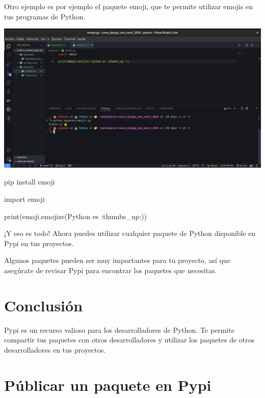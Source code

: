 \documentclass[
  a4paper,
  DIV=11,
  numbers=noendperiod,
  onepage,
  openany]{scrreprt}
\newenvironment{Shaded}{\begin{snugshade}}{\end{snugshade}}
\newcommand{\BuiltInTok}[1]{\textcolor[rgb]{0.00,0.23,0.31}{#1}}
\newcommand{\ExtensionTok}[1]{\textcolor[rgb]{0.00,0.23,0.31}{#1}}
\newcommand{\ImportTok}[1]{\textcolor[rgb]{0.00,0.46,0.62}{#1}}
\newcommand{\NormalTok}[1]{\textcolor[rgb]{0.00,0.23,0.31}{#1}}
\newcommand{\StringTok}[1]{\textcolor[rgb]{0.13,0.47,0.30}{#1}}
\begin{document}
\begin{tcolorbox}
Otro ejemplo es por ejemplo el paquete emoji, que te permite utilizar
emojis en tus programas de Python.

\includegraphics{unidades/unidad4/images/paste-2.png}

\begin{Shaded}
\begin{Highlighting}[]
\ExtensionTok{pip}\NormalTok{ install emoji}
\end{Highlighting}
\end{Shaded}

\begin{Shaded}
\begin{Highlighting}[]
\ImportTok{import}\NormalTok{ emoji}

\BuiltInTok{print}\NormalTok{(emoji.emojize(}\StringTok{\textquotesingle{}Python es :thumbs\_up:\textquotesingle{}}\NormalTok{))}
\end{Highlighting}
\end{Shaded}

¡Y eso es todo! Ahora puedes utilizar cualquier paquete de Python
disponible en Pypi en tus proyectos.

Algunos paquetes pueden ser muy importantes para tu proyecto, así que
asegúrate de revisar Pypi para encontrar los paquetes que necesitas.

\chapter{Conclusión}\label{conclusiuxf3n-1}

Pypi es un recurso valioso para los desarrolladores de Python. Te
permite compartir tus paquetes con otros desarrolladores y utilizar los
paquetes de otros desarrolladores en tus proyectos.

\chapter{Públicar un paquete en
Pypi}\label{puxfablicar-un-paquete-en-pypi}


\end{tcolorbox}
\end{document}
